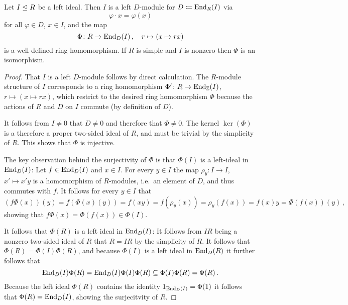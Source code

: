 \begin{lemma}[Rieffel]
  \label{lemma: simple ring isomorphic to endomorphism ring of ideal}
  Let $I \trianglelefteq R$ be a left ideal.
  Then $I$ is a left $D$-module for $D \coloneqq \operatorname{End}_R(I)$ via
  \[
      \varphi \cdot x
    = \varphi(x)
  \]
  for all $\varphi \in D$, $x \in I$, and the map
  \[
            \Phi    
    \colon  R
    \to     \operatorname{End}_D(I)\,,
    \quad   r
    \mapsto (x \mapsto rx)
  \]
  is a well-defined ring homomorphism.
  If $R$ is simple and $I$ is nonzero then $\Phi$ is an isomorphism.
\end{lemma}


\begin{proof}
  That $I$ is a left $D$-module follows by direct calculation.
  The $R$-module structure of $I$ corresponds to a ring homomorphism $\Phi' \colon R \to \operatorname{End}_{\mathbb{Z}}(I)$, $r \mapsto (x \mapsto rx)$, which restrict to the desired ring homomorphism $\Phi$ because the actions of $R$ and $D$ on $I$ commute (by definition of $D$).
  
  It follows from $I \neq 0$ that $D \neq 0$ and therefore that $\Phi \neq 0$.
  The kernel $\ker(\Phi)$ is a therefore a proper two-sided ideal of $R$, and must be trivial by the simplicity of $R$.
  This shows that $\Phi$ is injective.
  
  The key observation behind the surjectivity of $\Phi$ is that $\Phi(I)$ is a left-ideal in $\operatorname{End}_D(I)$:
  Let $f \in \operatorname{End}_D(I)$ and $x \in I$.
  For every $y \in I$ the map $\rho_y \colon I \to I$, $x' \mapsto x'y$ is a homomorphism of $R$-modules, i.e.\ an element of $D$, and thus commutes with $f$.
  It follows for every $y \in I$ that
  \[
      (f \Phi(x))(y)
    = f(\Phi(x)(y))
    = f(xy)
    = f(\rho_y(x))
    = \rho_y(f(x))
    = f(x)y
    = \Phi(f(x))(y) \,,
  \]
  showing that $f \Phi(x) = \Phi(f(x)) \in \Phi(I)$.
  
  It follows that $\Phi(R)$ is a left ideal in $\operatorname{End}_D(I)$:
  It follows from $IR$ being a nonzero two-sided ideal of $R$ that $R = IR$ by the simplicity of $R$.
  It follows that $\Phi(R) = \Phi(I)\Phi(R)$, and because $\Phi(I)$ is a left ideal in $\operatorname{End}_D(R)$ it further follows that
  \[
              \operatorname{End}_D(I) \Phi(R)
    =         \operatorname{End}_D(I) \Phi(I) \Phi(R)
    \subseteq \Phi(I) \Phi(R)
    =         \Phi(R) \,.
  \]
  Because the left ideal $\Phi(R)$ contains the identity $1_{\operatorname{End}_D(I)} = \Phi(1)$ it follows that $\Phi(R) = \operatorname{End}_D(I)$, showing the surjecitvity of $R$.
\end{proof}


